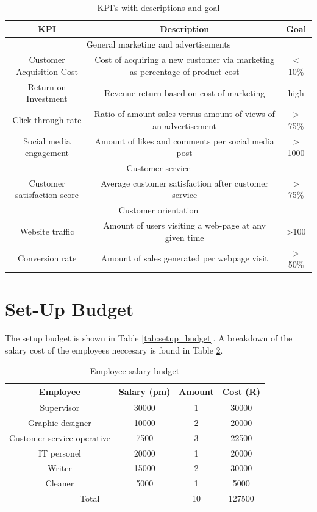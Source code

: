 \documentclass{article}
\begin{document}
\begin{table}[H]
    \centering
    \caption{KPI's with descriptions and goal}
    \begin{tabular}{|c|c|c|}
    \hline
    KPI & Description & Goal\\
    \hline
    \multicolumn{3}{c}{General marketing and advertisements}\\
    \hline
    Customer Acquisition Cost & Cost of acquiring a new customer via marketing as percentage of product cost & < 10\%\\
    Return on Investment & Revenue return based on cost of marketing & high\\
    Click through rate & Ratio of amount sales versus amount of views of an advertisement & > 75\%\\
    Social media engagement & Amount of likes and comments per social media post & > 1000\\
    \hline
    \multicolumn{3}{c}{Customer service}\\
    \hline
    Customer satisfaction score & Average customer satisfaction after customer service & > 75\%\\

    \hline
    \multicolumn{3}{c}{Customer orientation}\\
    \hline
    Website traffic & Amount of users visiting a web-page at any given time & >100 \\
    Conversion rate & Amount of sales generated per webpage visit & > 50\% \\

    \hline
    \hline
    
    
    \end{tabular}
    
    \label{tab:KPI}
\end{table}

 
\section{Set-Up Budget}
The setup budget is shown in Table \ref{tab:setup_budget}. A breakdown of the salary cost of the employees neccesary is found in Table \ref{tab:salary_budget}.
\begin{table}[H]
    \centering
    \caption{Employee salary budget}
    \begin{tabular}{|c|c|c|c|}
    \hline
    Employee&Salary (pm)&Amount&Cost (R) \\
    \hline
    Supervisor&30000&1&30000 \\
    Graphic designer&10000&2&20000 \\
    Customer service operative&7500&3&22500\\
    IT personel&20000&1&20000\\
    Writer&15000&2&30000\\
    Cleaner&5000&1&5000\\
    \hline
    \multicolumn{2}{|c|}{Total } & 10&127500\\
    \hline
    \hline
    
    \end{tabular}
    
    \label{tab:salary_budget}
\end{table}
\end{document}
